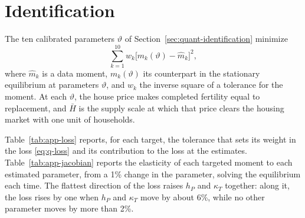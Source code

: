 \section{Identification}
\label{app:identification}

The ten calibrated parameters $\vartheta$ of Section~\ref{sec:quant-identification}
minimize
\begin{equation}
\sum_{k=1}^{10} w_k\bigl[m_k(\vartheta)-\hat m_k\bigr]^2,
\label{eq:q-loss}
\end{equation}
where $\hat m_k$ is a data moment, $m_k(\vartheta)$ its counterpart in the
stationary equilibrium at parameters $\vartheta$, and $w_k$ the inverse square
of a tolerance for the moment. At each $\vartheta$, the house price makes
completed fertility equal to replacement, and $\bar H$ is the supply scale at
which that price clears the housing market with one unit of households.

Table~\ref{tab:app-loss} reports, for each target, the tolerance that sets
its weight in the loss \eqref{eq:q-loss} and its contribution to the loss at
the estimates. Table~\ref{tab:app-jacobian} reports the elasticity of each
targeted moment to each estimated parameter, from a 1\% change in the
parameter, solving the equilibrium each time. The flattest direction of the
loss raises $h_P$ and $\kappa_T$ together: along it, the loss rises by one
when $h_P$ and $\kappa_T$ move by about 6\%, while no other parameter moves
by more than 2\%.

